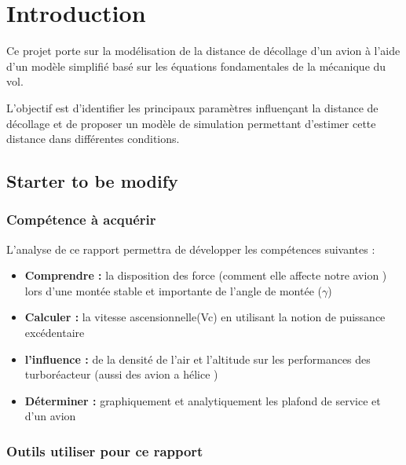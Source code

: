 


\chapter{Introduction}\label{ch:structure}

Ce projet porte sur la modélisation de la distance de décollage d’un avion à l’aide d’un modèle simplifié basé sur les équations fondamentales de la mécanique du vol.

L’objectif est d’identifier les principaux paramètres influençant la distance de décollage et de proposer un modèle de simulation permettant d’estimer cette distance dans différentes conditions.

\vspace{1cm}
%

\section{Starter to be modify} 

	\subsection{Compétence à acquérir}
	L'analyse de ce rapport permettra de développer les compétences suivantes :
	\begin{itemize}[itemsep=0pt]
		\item \textbf{Comprendre :} la disposition des force (comment elle affecte notre avion ) lors d'une montée stable et importante de l'angle de montée ($\gamma$)
		\item \textbf{Calculer  :} la vitesse ascensionnelle(Vc) en utilisant la notion de puissance excédentaire
		\item \textbf{l'influence :} de la densité de l'air et l'altitude sur les performances des turboréacteur (aussi des avion a hélice )
		\item \textbf{Déterminer  :} graphiquement et analytiquement les plafond de service et d'un avion
	\end{itemize}

	
	\subsection{Outils utiliser pour ce rapport}
	
